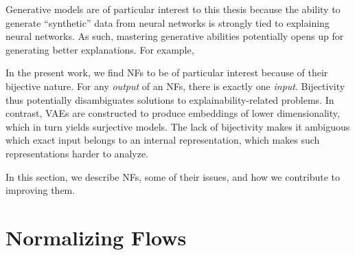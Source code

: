 Generative models are of particular interest to this thesis because the ability to generate ``synthetic'' data from neural networks is strongly tied to explaining neural networks.
As such, mastering generative abilities potentially opens up for generating better explanations.
For example, 

In the present work, we find NFs to be of particular interest because of their bijective nature. 
For any \emph{output} of an NFs, there is exactly one \emph{input}.
Bijectivity thus potentially disambiguates solutions to explainability-related problems.
In contrast, VAEs are constructed to produce embeddings of lower dimensionality, which in turn yields surjective models. 
The lack of bijectivity makes it ambiguous which exact input belongs to an internal representation, which makes such representations harder to analyze.

In this section, we describe NFs, some of their issues, and how we contribute to improving them. 


\section{Normalizing Flows}\label{sec:nf}


